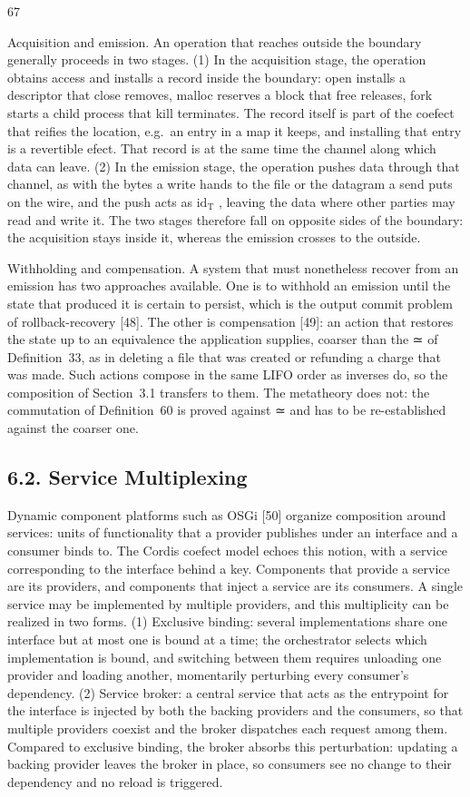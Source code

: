 \documentclass[
  10
]{article}
\newcounter{none} %
\begin{document}
67

Acquisition and emission. An operation that reaches outside the boundary
generally proceeds in two stages. (1) In the acquisition stage, the
operation obtains access and installs a record inside the boundary: open
installs a descriptor that close removes, malloc reserves a block that
free releases, fork starts a child process that kill terminates. The
record itself is part of the coefect that reifies the location, e.g.~an
entry in a map it keeps, and installing that entry is a revertible
efect. That record is at the same time the channel along which data can
leave. (2) In the emission stage, the operation pushes data through that
channel, as with the bytes a write hands to the file or the datagram a
send puts on the wire, and the push acts as \(\mathrm { i d _ { T } }\)
, leaving the data where other parties may read and write it. The two
stages therefore fall on opposite sides of the boundary: the acquisition
stays inside it, whereas the emission crosses to the outside.

Withholding and compensation. A system that must nonetheless recover
from an emission has two approaches available. One is to withhold an
emission until the state that produced it is certain to persist, which
is the output commit problem of rollback-recovery {[}48{]}. The other is
compensation {[}49{]}: an action that restores the state up to an
equivalence the application supplies, coarser than the ≃ of
Definition~33, as in deleting a file that was created or refunding a
charge that was made. Such actions compose in the same LIFO order as
inverses do, so the composition of Section~3.1 transfers to them. The
metatheory does not: the commutation of Definition~60 is proved against
≃ and has to be re-established against the coarser one.

\subsection{6.2. Service Multiplexing}\label{service-multiplexing}

Dynamic component platforms such as OSGi {[}50{]} organize composition
around services: units of functionality that a provider publishes under
an interface and a consumer binds to. The Cordis coefect model echoes
this notion, with a service corresponding to the interface behind a key.
Components that provide a service are its providers, and components that
inject a service are its consumers. A single service may be implemented
by multiple providers, and this multiplicity can be realized in two
forms. (1) Exclusive binding: several implementations share one
interface but at most one is bound at a time; the orchestrator selects
which implementation is bound, and switching between them requires
unloading one provider and loading another, momentarily perturbing every
consumer's dependency. (2) Service broker: a central service that acts
as the entrypoint for the interface is injected by both the backing
providers and the consumers, so that multiple providers coexist and the
broker dispatches each request among them. Compared to exclusive
binding, the broker absorbs this perturbation: updating a backing
provider leaves the broker in place, so consumers see no change to their
dependency and no reload is triggered.
\end{document}

